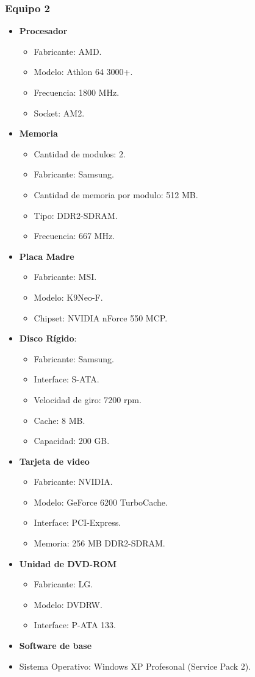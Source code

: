\subsubsection{Equipo 2}
\begin{itemize}
\item \textbf{Procesador}
	\begin{itemize}
	\item Fabricante: AMD.	
	\item Modelo: Athlon 64 3000+.
	\item Frecuencia: 1800 MHz.
	\item Socket: AM2.
	\end{itemize}
\item \textbf{Memoria}
	\begin{itemize}
	\item Cantidad de modulos: 2.
	\item Fabricante: Samsung.
	\item Cantidad de memoria por modulo: 512 MB.
	\item Tipo: DDR2-SDRAM.
	\item Frecuencia: 667 MHz.
	\end{itemize}
\item \textbf{Placa Madre}
	\begin{itemize}
	\item Fabricante: MSI.	
	\item Modelo: K9Neo-F.
	\item Chipset: NVIDIA nForce 550 MCP.
	\end{itemize}
\item \textbf{Disco Rígido}:
	\begin{itemize}
	\item Fabricante: Samsung.	
	\item Interface: S-ATA.
	\item Velocidad de giro: 7200 rpm.
	\item Cache: 8 MB.
	\item Capacidad: 200 GB.
	\end{itemize}
\item \textbf{Tarjeta de video}
	\begin{itemize}
	\item Fabricante: NVIDIA.
	\item Modelo: GeForce 6200 TurboCache.
	\item Interface: PCI-Express.
	\item Memoria: 256 MB DDR2-SDRAM.
	\end{itemize}
\item \textbf{Unidad de DVD-ROM}
	\begin{itemize}
	\item Fabricante: LG.
	\item Modelo: DVDRW.
	\item Interface: P-ATA 133.
	\end{itemize}
\item \textbf{Software de base}
	\item Sistema Operativo: Windows XP Profesonal (Service Pack 2).
\end{itemize} 
